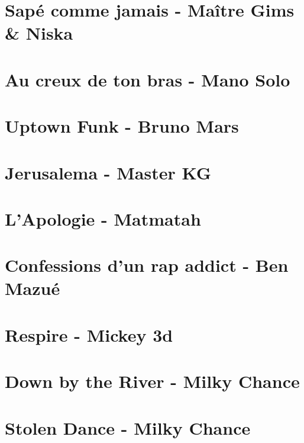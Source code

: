 \documentclass[11pt]{article}
\begin{document}
\section{Sapé comme jamais - Maître Gims \& Niska}



\section{Au creux de ton bras - Mano Solo}
\begin{guitar}

\end{guitar}

\section{Uptown Funk - Bruno Mars}


\section{Jerusalema - Master KG}


\section{L'Apologie - Matmatah}


\section{Confessions d'un rap addict - Ben Mazué}
\begin{guitar}

\end{guitar}

\section{Respire - Mickey 3d}




\section{Down by the River - Milky Chance}


\section{Stolen Dance - Milky Chance}
\begin{guitar}

\end{guitar}
\end{document}
